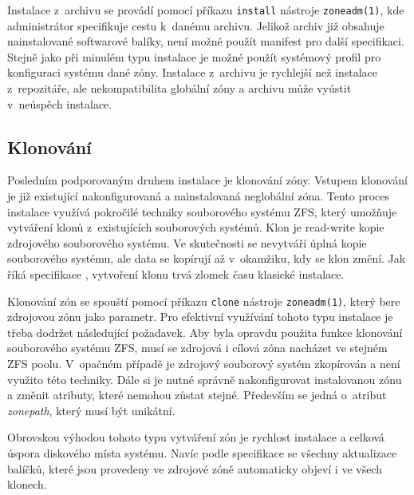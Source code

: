 Instalace z~archivu se provádí pomocí příkazu \verb|install| nástroje \verb|zoneadm(1)|, kde administrátor specifikuje
cestu k~danému archivu. Jelikož archiv již obsahuje nainstalované softwarové balíky, není možné použít manifest pro další specifikaci.
Stejně jako při minulém typu instalace je možné použít systémový profil pro konfiguraci systému dané zóny. Instalace
z~archivu je rychlejší než instalace z~repozitáře, ale nekompatibilita globální zóny a archivu může vyústit v~neúspěch instalace.
\subsection{Klonování}
\label{chapter:zones:instalation:cloning}
Posledním podporovaným druhem instalace je klonování zóny. Vstupem klonování je již existující nakonfigurovaná a nainstalovaná
neglobální zóna. Tento proces instalace využívá pokročilé techniky souborového systému ZFS, který umožňuje vytváření klonů z~existujících
souborových systémů. Klon je read-write kopie zdrojového souborového systému. Ve skutečnosti se nevytváří úplná kopie
souborového systému, ale data se kopírují až v~okamžiku, kdy se klon změní. Jak říká specifikace \cite{oracle:solaris:zones:clonning},
vytvoření klonu trvá zlomek času klasické instalace. 

Klonování zón se spouští pomocí příkazu \verb|clone| nástroje \verb|zoneadm(1)|, který bere zdrojovou zónu jako parametr. Pro efektivní
využívání tohoto typu instalace je třeba dodržet následující požadavek. Aby byla opravdu použita funkce klonování souborového systému
ZFS, musí se zdrojová i cílová zóna nacházet ve stejném ZFS poolu. V~opačném případě je zdrojový souborový systém zkopírován a
není využito této techniky. Dále si je nutné správně nakonfigurovat instalovanou zónu a změnit atributy, které
nemohou zůstat stejné. Především se jedná o~atribut \textit{zonepath}, který musí být unikátní.

Obrovskou výhodou tohoto typu vytváření zón je rychlost instalace a celková úspora diskového místa systému. Navíc podle specifikace
\cite{oracle:solaris:zones:clonning} se všechny aktualizace balíčků, které jsou provedeny ve zdrojové zóně automaticky objeví i ve
všech klonech.

